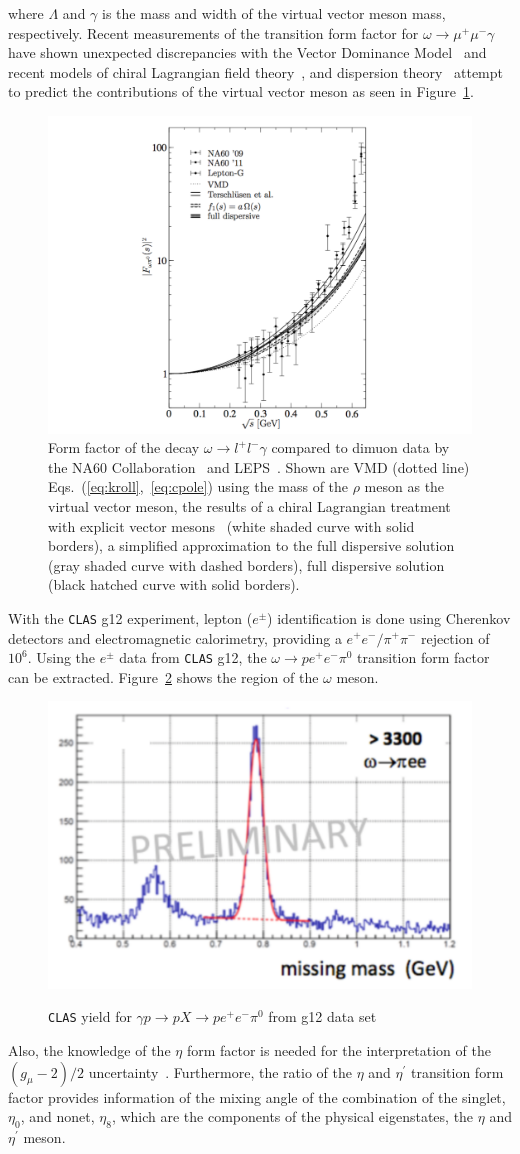 \documentclass{aip-cp}
\begin{document}
 where $\Lambda$ and $\gamma$ is the mass and width of the virtual vector meson mass, respectively.
 Recent measurements of the transition form factor for $\omega \to \mu^+\mu^- \gamma$ have shown unexpected discrepancies with the Vector Dominance Model~\cite{bib5} and recent models of chiral Lagrangian field theory~\cite{bib6}, and dispersion theory~\cite{Schneider} attempt to predict the contributions of the virtual vector meson as seen in Figure~\ref{fig:omega_ff}.
 \begin{figure}[h!]
 	\centerline{\includegraphics[width=250 pt, height=130 pt]{figures/omega_ff_bastian_edit.pdf}}
 	\caption{Form factor of the decay $\omega \to l^+l^- \gamma$ compared to dimuon data by the NA60 Collaboration~\cite{bib5,bib5_0} and LEPS~\cite{LEPS}. Shown are VMD (dotted line) Eqs.~(\ref{eq:kroll},~\ref{eq:cpole}) using the mass of the $\rho$ meson as the virtual vector meson, the results of a chiral Lagrangian treatment with explicit vector mesons~\cite{bib6} (white shaded curve with solid borders), a simplified approximation to the full dispersive solution~\cite{Schneider} (gray shaded curve with dashed borders), full dispersive solution~\cite{Schneider} (black hatched curve with solid borders).~\cite{Schneider}}
 	\label{fig:omega_ff}
 \end{figure}
 
With the \textsc{\texttt{CLAS}} g12 experiment, lepton ($e^{\pm}$) identification is done using Cherenkov detectors and electromagnetic calorimetry, providing a $e^{+}e^{-}/\pi^{+}\pi^{-}$ rejection of $10^6$. Using the $e^{\pm}$ data from \textsc{\texttt{CLAS}} g12, the $ \omega \to p e^+ e^- \pi^0$ transition form factor can be extracted. Figure~\ref{fig:clas_omega_ff} shows the region of the $\omega$ meson.
\begin{figure}[h!]
		\centering
		\centerline{\includegraphics[width=150 pt]{figures/clas_omega_ff_II.pdf}}
		\caption{\textsc{\texttt{CLAS}} yield for $\gamma p \to p X \to p e^+ e^- \pi^0 $ from g12 data set}{}
		\label{fig:clas_omega_ff}
\end{figure}
Also, the knowledge of the $\eta$ form factor is needed for the interpretation of the $(g_{\mu}-2)/2$ uncertainty~\cite{gminus2}. Furthermore, the ratio of the $\eta$ and $\eta^{\prime}$ transition form factor provides information of the mixing angle of the combination of the singlet, $\eta_0$, and nonet, $\eta_8$, which are the components of the physical eigenstates, the $\eta$ and $\eta^{\prime}$ meson.
\end{document}
